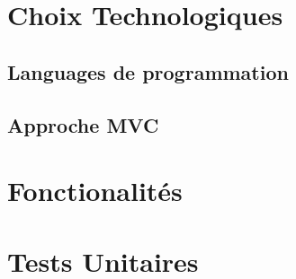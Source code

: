 \documentclass{article}
\begin{document}
\section{Choix Technologiques}

\subsection{Languages de programmation}
\subsection{Approche MVC}


\section{Fonctionalités}

\section{Tests Unitaires}
\end{document}
